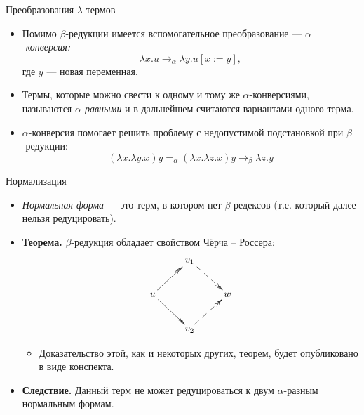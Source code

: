 \documentclass[xcolor=dvipsnames]{beamer}
\begin{document}
\begin{frame}{Преобразования $\lambda$-термов}

\begin{itemize}[<+->]
 \item Помимо $\beta$-редукции имеется вспомогательное преобразование --- {\em $\alpha$-конверсия:}
 \[
  \lambda x. u \to_\alpha \lambda y. u[x := y],
 \]
 где $y$ --- новая переменная.

 \item Термы, которые можно свести к одному и тому же $\alpha$-конверсиями, называются {\em $\alpha$-равными} и в дальнейшем считаются вариантами одного терма.
 
 \item $\alpha$-конверсия помогает решить проблему с недопустимой подстановкой при $\beta$-редукции:
 \[
  (\lambda x .\lambda y. x) y =_\alpha 
  (\lambda x . \lambda z. x) y \to_\beta
  \lambda z. y
 \]

\end{itemize}

 
\end{frame}

\begin{frame}{Нормализация}

\begin{itemize}[<+->]
 \item {\em Нормальная форма} --- это терм, в котором нет $\beta$-редексов (т.е. который далее нельзя редуцировать).
 
 \item {\bf Теорема.} $\beta$-редукция обладает свойством Чёрча -- Россера:
 \[
  \xymatrix{
   & v_1 \ar@{-->>}[dr] & \\
  u \ar@{->>}[ur]\ar@{->>}[dr] & & w \\
  & v_2 \ar@{-->>}[ur]
  }
 \]

 \begin{itemize}
 \item Доказательство этой, как и некоторых других, теорем, будет опубликовано в виде конспекта.
 \end{itemize}
 
 
 \item {\bf Следствие.} Данный терм не может редуцироваться к двум $\alpha$-разным нормальным формам.
\end{itemize}

 
\end{frame}
\end{document}
